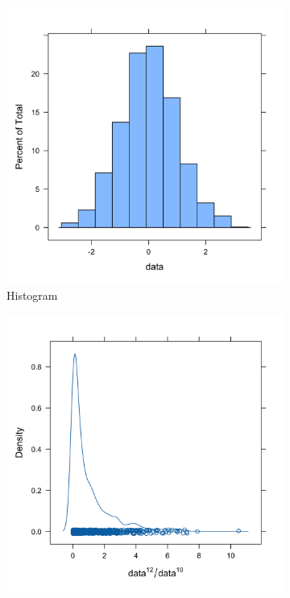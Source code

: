 \documentclass[10pt, a4paper, titlepage]{article}
\begin{document}
\begin{figure}[htbp]
    \centering
    \begin{subfigure}{0.45\textwidth}
        \centering
        \includegraphics[width=\textwidth]{histogram.png}
        \caption{Histogram}
        \label{fig:sub1}
    \end{subfigure}
    \hfill
    \begin{subfigure}{0.45\textwidth}
        \centering
        \includegraphics[width=\linewidth]{densityplot.png}

\end{subfigure}
\end{figure}
\end{document}
